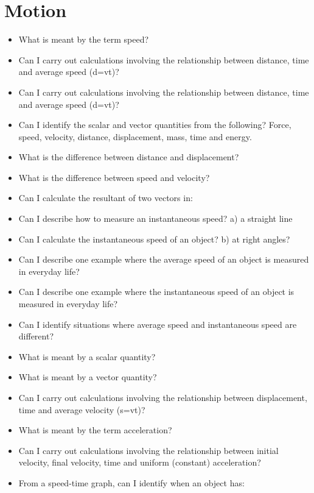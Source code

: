 \section{Motion}
\begin{multicols}{2}
	\begin{itemize}
		\item What is meant by the term speed?
		\item Can I carry out calculations involving the relationship between
			distance, time and average speed (d=vt)?
		\item Can I carry out calculations involving the relationship between
			distance, time and average speed (d=vt)?
		\item Can I identify the scalar and vector quantities from the following?
			Force, speed, velocity, distance, displacement, mass, time and energy.
		\item What is the difference between distance and displacement?
		\item What is the difference between speed and velocity?
		\item Can I calculate the resultant of two vectors in:
		\item Can I describe how to measure an instantaneous speed? a) a straight line
		\item Can I calculate the instantaneous speed of an object? b) at right angles?
		\item Can I describe one example where the average speed of an object is
			measured in everyday life?
		\item Can I describe one example where the instantaneous speed of an
			object is measured in everyday life?
		\item Can I identify situations where average speed and instantaneous
			speed are different?
		\item What is meant by a scalar quantity?
		\item What is meant by a vector quantity?
		\item Can I carry out calculations involving the relationship between
			displacement, time and average velocity (s=vt)?
		\item What is meant by the term acceleration?
		\item Can I carry out calculations involving the relationship between initial
			velocity, final velocity, time and uniform (constant) acceleration?
		\item From a speed-time graph, can I identify when an object has:
			\begin{enumerate}[label=(\alph*)]

\end{enumerate}
\end{itemize}
\end{multicols}
